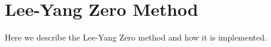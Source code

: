 \section{Lee-Yang Zero Method}
\label{LYZ}
Here we describe the Lee-Yang Zero method and how it is implemented.
